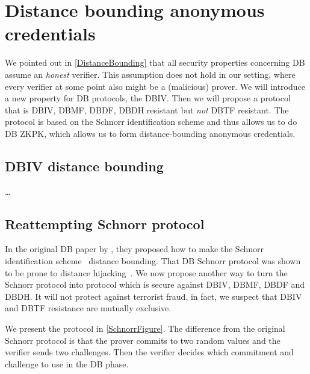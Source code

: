 \section{Distance bounding anonymous credentials}%
\label{DB-anon-cred}


We pointed out in \cref{DistanceBounding} that all security properties 
concerning \ac{DB} assume an \emph{honest} verifier.
This assumption does not hold in our setting, where every verifier at some point 
also might be a (malicious) prover.
We will introduce a new property for \ac{DB} protocols, the \ac{DBIV}.
Then we will propose a protocol that is \ac{DBIV}, \ac{DBMF}, \ac{DBDF}, 
\ac{DBDH} resistant but \emph{not} \ac{DBTF} resistant.
The protocol is based on the Schnorr identification scheme and thus allows us to 
do \ac{DB} \ac{ZKPK}, which allows us to form distance-bounding anonymous 
credentials.

\subsection{\Acl{DBIV} distance bounding}

\dots

\subsection{Reattempting  Schnorr protocol}


In the original \ac{DB} paper by \citet{DistanceBounding}, they proposed how to 
make the Schnorr identification scheme~\cite{Schnorr} distance bounding.
That \ac{DB} Schnorr protocol was shown to be prone to distance 
hijacking~\cite{DistanceHijacking}.
We now propose another way to turn the Schnorr protocol into  protocol 
which is secure against \ac{DBIV}, \ac{DBMF}, \ac{DBDF} and \ac{DBDH}.
It will not protect against terrorist fraud, in fact, we suspect that \ac{DBIV} 
and \ac{DBTF} resistance are mutually exclusive.

We present the protocol in \cref{SchnorrFigure}.
The difference from the original Schnorr protocol is that the prover commits to 
two random values and the verifier sends two challenges.
Then the verifier decides which commitment and challenge to use in the \ac{DB} 
phase.

